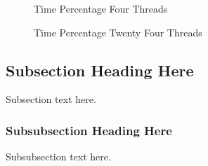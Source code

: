 \documentclass[journal]{IEEEtran}
\begin{document}

\begin{figure}[!t]
  \caption{Time Percentage Four Threads}
  \label{fig:timeperfour}
\end{figure}

\begin{figure}[!t]
  \caption{Time Percentage Twenty Four Threads}
  \label{fig:timepertwentyfour}
\end{figure}

\subsection{Subsection Heading Here}
Subsection text here.


\subsubsection{Subsubsection Heading Here}
Subsubsection text here.


%
%

\end{document}
